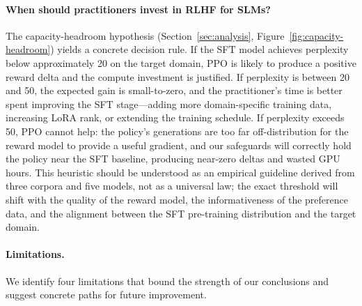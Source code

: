 \documentclass[10pt,twocolumn,letterpaper]{article}
\begin{document}
\paragraph{When should practitioners invest in RLHF for SLMs?}
The capacity-headroom hypothesis (Section~\ref{sec:analysis}, Figure~\ref{fig:capacity-headroom}) yields a concrete decision rule. If the SFT model achieves perplexity below approximately 20 on the target domain, PPO is likely to produce a positive reward delta and the compute investment is justified. If perplexity is between 20 and 50, the expected gain is small-to-zero, and the practitioner's time is better spent improving the SFT stage---adding more domain-specific training data, increasing LoRA rank, or extending the training schedule. If perplexity exceeds 50, PPO cannot help: the policy's generations are too far off-distribution for the reward model to provide a useful gradient, and our safeguards will correctly hold the policy near the SFT baseline, producing near-zero deltas and wasted GPU hours. This heuristic should be understood as an empirical guideline derived from three corpora and five models, not as a universal law; the exact threshold will shift with the quality of the reward model, the informativeness of the preference data, and the alignment between the SFT pre-training distribution and the target domain.

\paragraph{Limitations.}
We identify four limitations that bound the strength of our conclusions and suggest concrete paths for future improvement.
\end{document}
